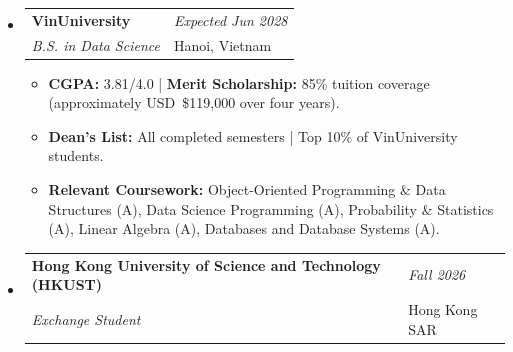 \documentclass[a4paper,10pt]{article}
\makeatletter
\newcommand{\resumeHeading}[4]{%
  \begin{tabularx}{\textwidth}[t]{%
    @{}>{\raggedright\arraybackslash}X
    >{\raggedleft\arraybackslash}p{0.24\textwidth}@{}%
  }
    \textbf{#1} & \textit{#2} \\
    \textit{#3} & #4
  \end{tabularx}%
}
\makeatother
\begin{document}
\begin{itemize}

  \item \resumeHeading
    {VinUniversity}
    {Expected Jun 2028}
    {B.S. in Data Science}
    {Hanoi, Vietnam}
    \begin{itemize}
      \item \textbf{CGPA:} 3.81/4.0
      \;|\;
      \textbf{Merit Scholarship:} 85\% tuition coverage
      (approximately USD~\$119,000 over four years).

      \item \textbf{Dean's List:} All completed semesters
      \;|\;
      Top 10\% of VinUniversity students.

      \item \textbf{Relevant Coursework:}
      Object-Oriented Programming \& Data Structures (A),
      Data Science Programming (A),
      Probability \& Statistics (A),
      Linear Algebra (A),
      Databases and Database Systems (A).
    \end{itemize}

  \item \resumeHeading
    {Hong Kong University of Science and Technology (HKUST)}
    {Fall 2026}
    {Exchange Student}
    {Hong Kong SAR}

\end{itemize}

\end{document}
